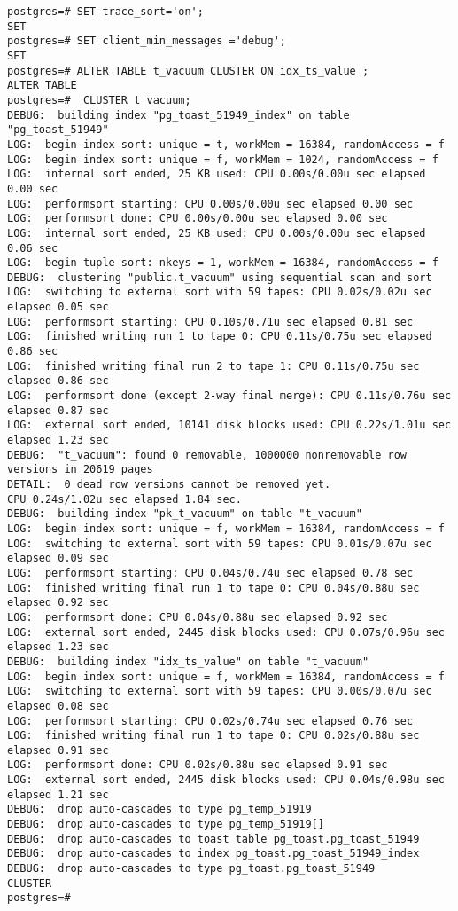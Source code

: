 \begin{lstlisting}[style=pgsql]
postgres=# SET trace_sort='on';
SET
postgres=# SET client_min_messages ='debug';
SET
postgres=# ALTER TABLE t_vacuum CLUSTER ON idx_ts_value ;
ALTER TABLE
postgres=#  CLUSTER t_vacuum;
DEBUG:  building index "pg_toast_51949_index" on table "pg_toast_51949"
LOG:  begin index sort: unique = t, workMem = 16384, randomAccess = f
LOG:  begin index sort: unique = f, workMem = 1024, randomAccess = f
LOG:  internal sort ended, 25 KB used: CPU 0.00s/0.00u sec elapsed 0.00 sec
LOG:  performsort starting: CPU 0.00s/0.00u sec elapsed 0.00 sec
LOG:  performsort done: CPU 0.00s/0.00u sec elapsed 0.00 sec
LOG:  internal sort ended, 25 KB used: CPU 0.00s/0.00u sec elapsed 0.06 sec
LOG:  begin tuple sort: nkeys = 1, workMem = 16384, randomAccess = f
DEBUG:  clustering "public.t_vacuum" using sequential scan and sort
LOG:  switching to external sort with 59 tapes: CPU 0.02s/0.02u sec elapsed 0.05 sec
LOG:  performsort starting: CPU 0.10s/0.71u sec elapsed 0.81 sec
LOG:  finished writing run 1 to tape 0: CPU 0.11s/0.75u sec elapsed 0.86 sec
LOG:  finished writing final run 2 to tape 1: CPU 0.11s/0.75u sec elapsed 0.86 sec
LOG:  performsort done (except 2-way final merge): CPU 0.11s/0.76u sec elapsed 0.87 sec
LOG:  external sort ended, 10141 disk blocks used: CPU 0.22s/1.01u sec elapsed 1.23 sec
DEBUG:  "t_vacuum": found 0 removable, 1000000 nonremovable row versions in 20619 pages
DETAIL:  0 dead row versions cannot be removed yet.
CPU 0.24s/1.02u sec elapsed 1.84 sec.
DEBUG:  building index "pk_t_vacuum" on table "t_vacuum"
LOG:  begin index sort: unique = f, workMem = 16384, randomAccess = f
LOG:  switching to external sort with 59 tapes: CPU 0.01s/0.07u sec elapsed 0.09 sec
LOG:  performsort starting: CPU 0.04s/0.74u sec elapsed 0.78 sec
LOG:  finished writing final run 1 to tape 0: CPU 0.04s/0.88u sec elapsed 0.92 sec
LOG:  performsort done: CPU 0.04s/0.88u sec elapsed 0.92 sec
LOG:  external sort ended, 2445 disk blocks used: CPU 0.07s/0.96u sec elapsed 1.23 sec
DEBUG:  building index "idx_ts_value" on table "t_vacuum"
LOG:  begin index sort: unique = f, workMem = 16384, randomAccess = f
LOG:  switching to external sort with 59 tapes: CPU 0.00s/0.07u sec elapsed 0.08 sec
LOG:  performsort starting: CPU 0.02s/0.74u sec elapsed 0.76 sec
LOG:  finished writing final run 1 to tape 0: CPU 0.02s/0.88u sec elapsed 0.91 sec
LOG:  performsort done: CPU 0.02s/0.88u sec elapsed 0.91 sec
LOG:  external sort ended, 2445 disk blocks used: CPU 0.04s/0.98u sec elapsed 1.21 sec
DEBUG:  drop auto-cascades to type pg_temp_51919
DEBUG:  drop auto-cascades to type pg_temp_51919[]
DEBUG:  drop auto-cascades to toast table pg_toast.pg_toast_51949
DEBUG:  drop auto-cascades to index pg_toast.pg_toast_51949_index
DEBUG:  drop auto-cascades to type pg_toast.pg_toast_51949
CLUSTER
postgres=# 

\end{lstlisting}


